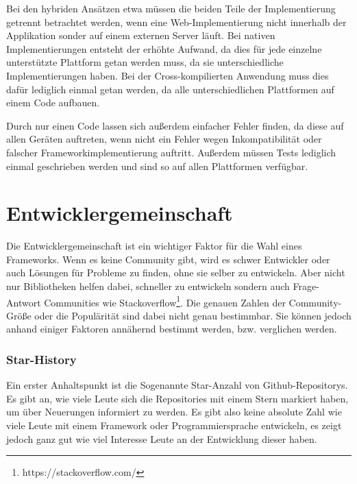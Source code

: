 Bei den hybriden Ansätzen etwa müssen die beiden Teile der Implementierung getrennt betrachtet werden, wenn eine Web-Implementierung nicht innerhalb der Applikation sonder auf einem externen Server läuft. Bei nativen Implementierungen entsteht der erhöhte Aufwand, da dies für jede einzelne unterstützte Plattform getan werden muss, da sie unterschiedliche Implementierungen haben. Bei der Cross-kompilierten Anwendung muss dies dafür lediglich einmal getan werden, da alle unterschiedlichen Plattformen auf einem Code aufbauen.

Durch nur einen Code lassen sich außerdem einfacher Fehler finden, da diese auf allen Geräten auftreten, wenn nicht ein Fehler wegen Inkompatibilität oder falscher Frameworkimplementierung auftritt. Außerdem müssen Tests lediglich einmal geschrieben werden und sind so auf allen Plattformen verfügbar.

\section{Entwicklergemeinschaft}
Die Entwicklergemeinschaft ist ein wichtiger Faktor für die Wahl eines Frameworks. Wenn es keine Community gibt, wird es schwer Entwickler oder auch Lösungen für Probleme zu finden, ohne sie selber zu entwickeln. Aber nicht nur Bibliotheken helfen dabei, schneller zu entwickeln sondern auch Frage-Antwort Communities wie Stackoverflow\footnote{https://stackoverflow.com/}.  Die genauen Zahlen der Community-Größe oder die Populärität sind dabei nicht genau bestimmbar. Sie können jedoch anhand einiger Faktoren annähernd bestimmt werden, bzw. verglichen werden.

\subsubsection{Star-History}

Ein erster Anhaltspunkt ist die Sogenannte Star-Anzahl von Github-Repositorys. Es gibt an, wie viele Leute sich die Repositories mit einem Stern markiert haben, um über Neuerungen informiert zu werden. Es gibt also keine absolute Zahl wie viele Leute mit einem Framework oder Programmiersprache entwickeln, es zeigt jedoch ganz gut wie viel Interesse Leute an der Entwicklung dieser haben.

